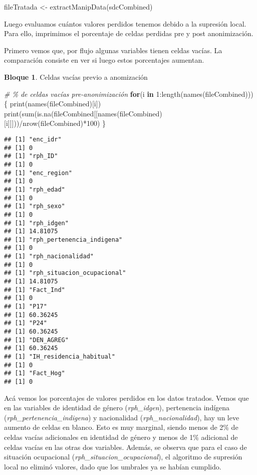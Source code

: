 \documentclass[
]{book}
\newenvironment{Shaded}{\begin{snugshade}}{\end{snugshade}}
\newcommand{\CommentTok}[1]{\textcolor[rgb]{0.56,0.35,0.01}{\textit{#1}}}
\newcommand{\ControlFlowTok}[1]{\textcolor[rgb]{0.13,0.29,0.53}{\textbf{#1}}}
\newcommand{\DecValTok}[1]{\textcolor[rgb]{0.00,0.00,0.81}{#1}}
\newcommand{\FunctionTok}[1]{\textcolor[rgb]{0.00,0.00,0.00}{#1}}
\newcommand{\NormalTok}[1]{#1}
\newcommand{\OtherTok}[1]{\textcolor[rgb]{0.56,0.35,0.01}{#1}}
\newcommand{\SpecialCharTok}[1]{\textcolor[rgb]{0.00,0.00,0.00}{#1}}
\theoremstyle{definition}
\theoremstyle{definition}
\newtheorem{example}{Bloque}[chapter]
\theoremstyle{definition}
\theoremstyle{definition}
\theoremstyle{remark}
\begin{document}
\begin{Shaded}
\begin{Highlighting}[]
\NormalTok{fileTratada }\OtherTok{\textless{}{-}} \FunctionTok{extractManipData}\NormalTok{(sdcCombined)}
\end{Highlighting}
\end{Shaded}

Luego evaluamos cuántos valores perdidos tenemos debido a la supresión local. Para ello, imprimimos el porcentaje de celdas perdidas pre y post anonimización.

Primero vemos que, por flujo algunas variables tienen celdas vacías. La comparación consiste en ver si luego estos porcentajes aumentan.

\begin{example}
\protect\hypertarget{exm:bloque71nbm}{}\label{exm:bloque71nbm}Celdas vacías previo a anomización
\end{example}

\begin{Shaded}
\begin{Highlighting}[]
\CommentTok{\# \% de celdas vacías pre{-}anonimización}
\ControlFlowTok{for}\NormalTok{(i }\ControlFlowTok{in} \DecValTok{1}\SpecialCharTok{:}\FunctionTok{length}\NormalTok{(}\FunctionTok{names}\NormalTok{(fileCombined)))\{}
  \FunctionTok{print}\NormalTok{(}\FunctionTok{names}\NormalTok{(fileCombined)[i])}
  \FunctionTok{print}\NormalTok{(}\FunctionTok{sum}\NormalTok{(}\FunctionTok{is.na}\NormalTok{(fileCombined[[}\FunctionTok{names}\NormalTok{(fileCombined)[i]]]))}\SpecialCharTok{/}\FunctionTok{nrow}\NormalTok{(fileCombined)}\SpecialCharTok{*}\DecValTok{100}\NormalTok{)}
\NormalTok{\}}
\end{Highlighting}
\end{Shaded}

\begin{verbatim}
## [1] "enc_idr"
## [1] 0
## [1] "rph_ID"
## [1] 0
## [1] "enc_region"
## [1] 0
## [1] "rph_edad"
## [1] 0
## [1] "rph_sexo"
## [1] 0
## [1] "rph_idgen"
## [1] 14.81075
## [1] "rph_pertenencia_indigena"
## [1] 0
## [1] "rph_nacionalidad"
## [1] 0
## [1] "rph_situacion_ocupacional"
## [1] 14.81075
## [1] "Fact_Ind"
## [1] 0
## [1] "P17"
## [1] 60.36245
## [1] "P24"
## [1] 60.36245
## [1] "DEN_AGREG"
## [1] 60.36245
## [1] "IH_residencia_habitual"
## [1] 0
## [1] "Fact_Hog"
## [1] 0
\end{verbatim}

Acá vemos los porcentajes de valores perdidos en los datos tratados. Vemos que en las variables de identidad de género (\emph{rph\_idgen}), pertenencia indígena (\emph{rph\_pertenencia\_indigena}) y nacionalidad (\emph{rph\_nacionalidad}), hay un leve aumento de celdas en blanco. Esto es muy marginal, siendo menos de 2\% de celdas vacías adicionales en identidad de género y menos de 1\% adicional de celdas vacías en las otras dos variables. Además, se observa que para el caso de situación ocupacional (\emph{rph\_situacion\_ocupacional}), el algoritmo de supresión local no eliminó valores, dado que los umbrales ya se habían cumplido.
\end{document}
